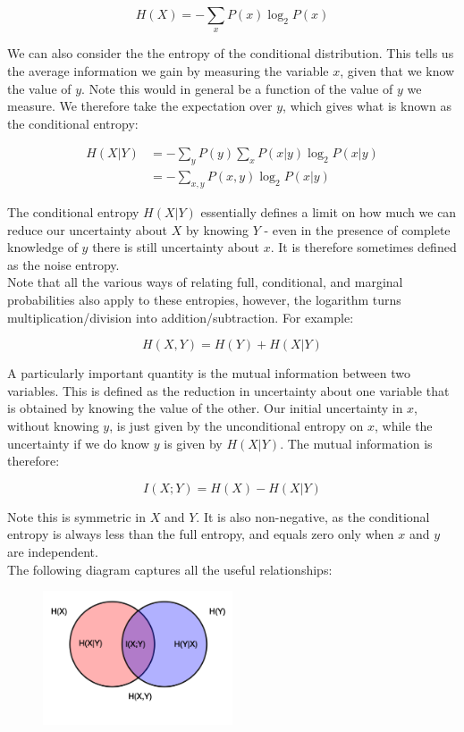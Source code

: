 \documentclass{article}
\begin{document}
\begin{equation*}
    H(X) = -\sum_x P(x) \log_2P(x)
\end{equation*}

We can also consider the the entropy of the conditional distribution. This tells us the average information we gain by measuring the variable $x$, given that we know the value of $y$. Note this would in general be a function of the value of $y$ we measure. We therefore take the expectation over $y$, which gives what is known as the conditional entropy:

\begin{align*}
    H(X|Y) &= -\sum_{y} P(y) \sum_x P(x|y) \log_2P(x|y)\\
    &= -\sum_{x,y} P(x,y) \log_2P(x|y)
\end{align*}

The conditional entropy $H(X|Y)$ essentially defines a limit on how much we can reduce our uncertainty about $X$ by knowing $Y$ - even in the presence of complete knowledge of $y$ there is still uncertainty about $x$. It is therefore sometimes defined as the noise entropy.\\

Note that all the various ways of relating full, conditional, and marginal probabilities also apply to these entropies, however, the logarithm turns multiplication/division into addition/subtraction. For example:

\begin{equation*}
    H(X,Y) = H(Y) + H(X|Y)
\end{equation*}

A particularly important quantity is the mutual information between two variables. This is defined as the reduction in uncertainty about one variable that is obtained by knowing the value of the other. Our initial uncertainty in $x$, without knowing $y$, is just given by the unconditional entropy on $x$, while the uncertainty if we do know $y$ is given by $H(X|Y)$. The mutual information is therefore:

\begin{equation*}
    I(X;Y) = H(X) - H(X|Y)
\end{equation*}

Note this is symmetric in $X$ and $Y$. It is also non-negative, as the conditional entropy is always less than the full entropy, and equals zero only when $x$ and $y$ are independent.\\

The following diagram captures all the useful relationships:

\begin{figure}[h] %
    \centering %
    \includegraphics[width=0.5\textwidth]{entropy.png} %
\end{figure}
\end{document}

